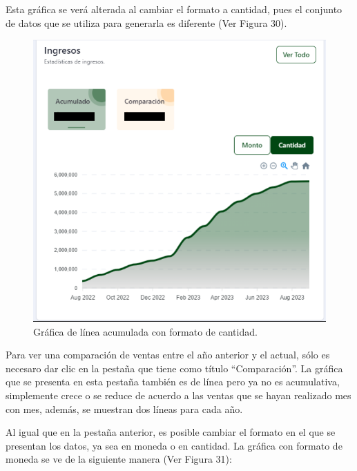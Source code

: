 Esta gráfica se verá alterada al cambiar el formato a cantidad, pues el conjunto de datos que se utiliza para generarla es diferente (Ver Figura 30).

    \begin{figure}[H]
        \begin{center}
            \includegraphics[scale=0.29]{img/actividades/dahsboard-admin/ingreso-acumulado-cantidad.png}
            \caption{Gráfica de línea acumulada con formato de cantidad.}
            \label{fig:ingreso-acumulado-cantidad}
        \end{center}
    \end{figure}

Para ver una comparación de ventas entre el año anterior y el actual, sólo es necesaro dar clic en la pestaña que tiene como título ``Comparación''. La gráfica que se presenta en esta pestaña también es de línea pero ya no es acumulativa, simplemente crece o se reduce de acuerdo a las ventas que se hayan realizado mes con mes, además, se muestran dos líneas para cada año. 

Al igual que en la pestaña anterior, es posible cambiar el formato en el que se presentan los datos, ya sea en moneda o en cantidad. La gráfica con formato de moneda se ve de la siguiente manera (Ver Figura 31): 

